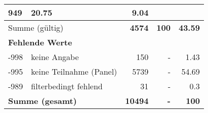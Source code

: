 \begin{longtable}{lXrrr}
       \num{949} &
       \num[round-mode=places,round-precision=2]{20,75} &
         \num[round-mode=places,round-precision=2]{9,04} \\
     \midrule
     \multicolumn{2}{l}{Summe (gültig)} &
       \textbf{\num{4574}} &
     \textbf{100} &
       \textbf{\num[round-mode=places,round-precision=2]{43,59}} \\
     \multicolumn{5}{l}{\textbf{Fehlende Werte}}\\
       -998 &
       keine Angabe &
         \num{150} &
        - &
         \num[round-mode=places,round-precision=2]{1,43} \\
       -995 &
       keine Teilnahme (Panel) &
         \num{5739} &
        - &
         \num[round-mode=places,round-precision=2]{54,69} \\
       -989 &
       filterbedingt fehlend &
         \num{31} &
        - &
         \num[round-mode=places,round-precision=2]{0,3} \\
     \midrule
     \multicolumn{2}{l}{\textbf{Summe (gesamt)}} &
          \textbf{\num{10494}} &
        \textbf{-} &
        \textbf{100} \\
     \bottomrule
     \end{longtable}
     
